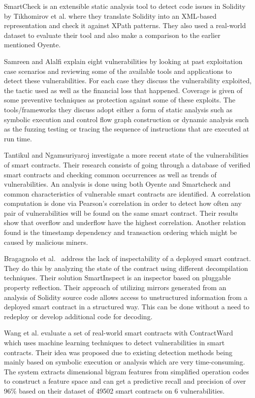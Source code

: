 \documentclass[10pt,conference]{IEEEtran}
\begin{document}
SmartCheck is an extensible static analysis tool to detect code issues in Solidity by Tikhomirov et al.\cite{smartcheck} where they translate Solidity into an XML-based representation and check it against XPath patterns. They also used a real-world dataset to evaluate their tool and also make a comparison to the earlier mentioned Oyente.


Samreen and Alalfi \cite{survey} explain eight vulnerabilities by looking at past exploitation case scenarios and reviewing some of the available tools and applications to detect these vulnerabilities. For each case they discuss the vulnerability exploited, the tactic used as well as the financial loss that happened. Coverage is given of some preventive techniques as protection against some of these exploits. The tools/frameworks they discuss adopt either a form of static analysis such as symbolic execution and control flow graph construction or dynamic analysis such as the fuzzing testing or tracing the sequence of instructions that are executed at run time.

Tantikul and Ngamsuriyaroj \cite{icissp20} investigate a more recent state of the vulnerabilities of smart contracts. Their research consists of going through a database of verified smart contracts and checking common occurrences as well as trends of vulnerabilities. An analysis is done using both Oyente and Smartcheck and common characteristics of vulnerable smart contracts are identified. A correlation computation is done via Pearson's correlation in order to detect how often any pair of vulnerabilities will be found on the same smart contract. Their results show that overflow and underflow have the highest correlation. Another relation found is the timestamp dependency and transaction ordering which might be caused by malicious miners.  

Bragagnolo et al.~\cite{rocha} address the lack of inspectability of a deployed smart contract. They do this by analyzing the state of the contract using different decompilation techniques. Their solution SmartInspect is an inspector based on pluggable property reflection. Their approach of utilizing mirrors generated from an analysis of Solidity source code allows access to unstructured information from a deployed smart contract in a structured way. This can be done without a need to redeploy or develop additional code for decoding.

Wang et al. \cite{contractward} evaluate a set of real-world smart contracts with ContractWard which uses machine learning techniques to detect vulnerabilities in smart contracts. Their idea was proposed due to existing detection methods being mainly based on symbolic execution or analysis which are very time-consuming. The system extracts dimensional bigram features from simplified operation codes to construct a feature space and can get a predictive recall and precision of over 96\% based on their dataset of 49502 smart contracts on 6 vulnerabilities.
\end{document}
